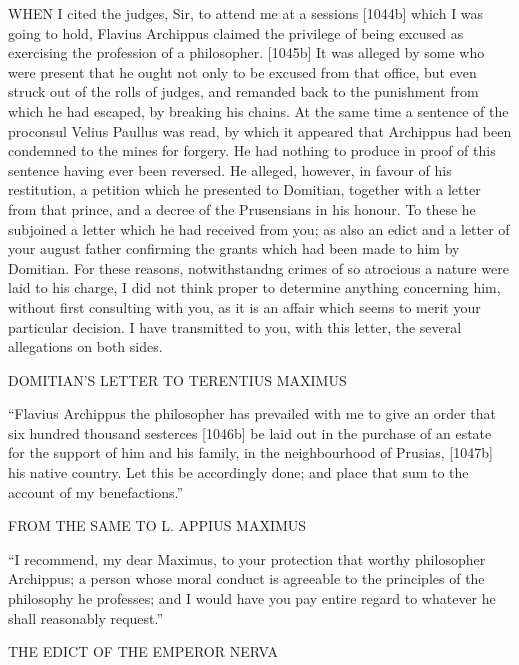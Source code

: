 
WHEN I cited the judges, Sir, to attend me at a sessions [1044b]
which I was going to hold, Flavius Archippus claimed the privilege of
being excused as exercising the profession of a philosopher. [1045b]
It was alleged by some who were present that he ought not only to be
excused from that office, but even struck out of the rolls of judges, and
remanded back to the punishment from which he had escaped, by breaking his
chains. At the same time a sentence of the proconsul Velius Paullus was
read, by which it appeared that Archippus had been condemned to the mines
for forgery. He had nothing to produce in proof of this sentence having
ever been reversed. He alleged, however, in favour of his restitution, a
petition which he presented to Domitian, together with a letter from that
prince, and a decree of the Prusensians in his honour. To these he
subjoined a letter which he had received from you; as also an edict and a
letter of your august father confirming the grants which had been made to
him by Domitian. For these reasons, notwithstandng crimes of so atrocious
a nature were laid to his charge, I did not think proper to determine
anything concerning him, without first consulting with you, as it is an
affair which seems to merit your particular decision. I have transmitted
to you, with this letter, the several allegations on both sides.

DOMITIAN'S LETTER TO TERENTIUS MAXIMUS

``Flavius Archippus the philosopher has prevailed with me to give an order
that six hundred thousand sesterces [1046b] be laid out in
the purchase of an estate for the support of him and his family, in the
neighbourhood of Prusias, [1047b] his native
country. Let this be accordingly done; and place that sum to the account
of my benefactions.''

FROM THE SAME TO L. APPIUS MAXIMUS

``I recommend, my dear Maximus, to your protection that worthy philosopher
Archippus; a person whose moral conduct is agreeable to the principles of
the philosophy he professes; and I would have you pay entire regard to
whatever he shall reasonably request.''

THE EDICT OF THE EMPEROR NERVA

